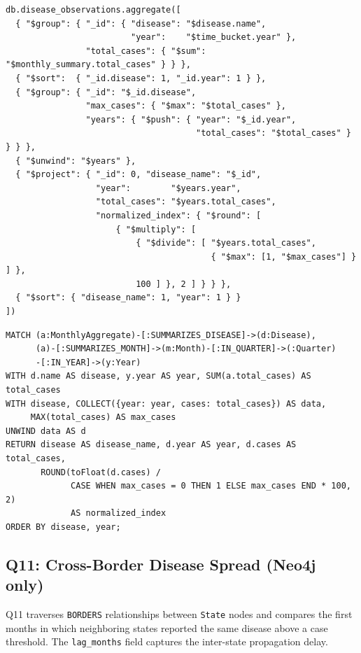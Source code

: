 \documentclass[12pt,a4paper]{article}
\begin{document}
\begin{lstlisting}[language={}, caption={Q10: MongoDB.}]
db.disease_observations.aggregate([
  { "$group": { "_id": { "disease": "$disease.name",
                         "year":    "$time_bucket.year" },
                "total_cases": { "$sum": "$monthly_summary.total_cases" } } },
  { "$sort":  { "_id.disease": 1, "_id.year": 1 } },
  { "$group": { "_id": "$_id.disease",
                "max_cases": { "$max": "$total_cases" },
                "years": { "$push": { "year": "$_id.year",
                                      "total_cases": "$total_cases" } } } },
  { "$unwind": "$years" },
  { "$project": { "_id": 0, "disease_name": "$_id",
                  "year":        "$years.year",
                  "total_cases": "$years.total_cases",
                  "normalized_index": { "$round": [
                      { "$multiply": [
                          { "$divide": [ "$years.total_cases",
                                         { "$max": [1, "$max_cases"] } ] },
                          100 ] }, 2 ] } } },
  { "$sort": { "disease_name": 1, "year": 1 } }
])
\end{lstlisting}

\begin{lstlisting}[language=cypher, caption={Q10: Neo4j.}]
MATCH (a:MonthlyAggregate)-[:SUMMARIZES_DISEASE]->(d:Disease),
      (a)-[:SUMMARIZES_MONTH]->(m:Month)-[:IN_QUARTER]->(:Quarter)
      -[:IN_YEAR]->(y:Year)
WITH d.name AS disease, y.year AS year, SUM(a.total_cases) AS total_cases
WITH disease, COLLECT({year: year, cases: total_cases}) AS data,
     MAX(total_cases) AS max_cases
UNWIND data AS d
RETURN disease AS disease_name, d.year AS year, d.cases AS total_cases,
       ROUND(toFloat(d.cases) /
             CASE WHEN max_cases = 0 THEN 1 ELSE max_cases END * 100, 2)
             AS normalized_index
ORDER BY disease, year;
\end{lstlisting}


\subsection*{Q11: Cross-Border Disease Spread (Neo4j only)}

Q11 traverses \texttt{BORDERS} relationships between \texttt{State} nodes and compares the first months in which neighboring states reported the same disease above a case threshold. The \texttt{lag\_months} field captures the inter-state propagation delay.
\end{document}
